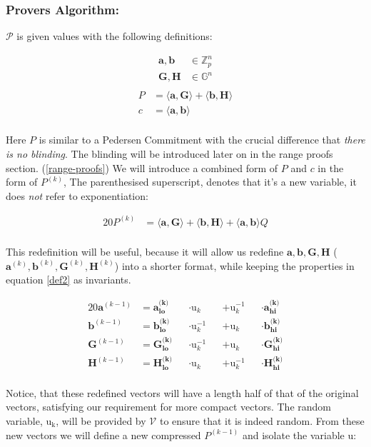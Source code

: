 \documentclass{article}
\newcommand{\eq}[1]{\begin{alignat*}{20}#1\end{alignat*}}
\newcommand{\eqn}[2]{\begin{equation}\label{#1}\begin{split}#2\end{split}\end{equation}}
\renewcommand{\vec}[1]{\boldsymbol{#1}}
\newcommand{\ran}[1]{\mathrm{#1}}
\newcommand{\V}{\mathcal{V}}
\renewcommand{\P}{\mathcal{P}}
\newcommand{\G}{\mathbb{G}}
\newcommand{\Z}{\mathbb{Z}}
\newcommand{\dotp}[2]{\langle #1, #2 \rangle}
\newcommand{\opn}[1]{\operatorname{#1}}
\newcommand{\veclo}[1]{\vec{#1_{\opn{lo}}}}
\newcommand{\vechi}[1]{\vec{#1_{\opn{hi}}}}
\begin{document}
\subsubsection{Provers Algorithm:}
$\P$ is given values with the following definitions:

\eqn{def1}{
	\vec{a}, \vec{b} &\in \Z^n_p \\
	\vec{G}, \vec{H} &\in \G^n \\
}
\eqn{def2}{
	P &= \dotp{\vec{a}}{\vec{G}} + \dotp{\vec{b}}{\vec{H}} \\
	c &= \dotp{\vec{a}}{\vec{b}} \\
}

Here $P$ is similar to a Pedersen Commitment with the crucial difference
that \textit{there is no blinding}. The blinding will be introduced
later on in the range proofs section. (\ref{range-proofs}) We will
introduce a combined form of $P$ and $c$ in the form of $P^{(k)}$,
The parenthesised superscript, denotes that it's a new variable,
it does \textit{not} refer to exponentiation:

\eq{
	P^{(k)} &= \dotp{\vec{a}}{\vec{G}} +
	           \dotp{\vec{b}}{\vec{H}} +
	           \dotp{\vec{a}}{\vec{b}}Q \\
} 

This redefinition will be useful, because it will allow us redefine
$\vec{a}, \vec{b}, \vec{G}, \vec{H}$ ($\vec{a}^{(k)}, \vec{b}^{(k)},
\vec{G}^{(k)}, \vec{H}^{(k)}$) into a shorter format, while keeping the
properties in equation \ref{def2} as invariants.

\eq{
	\vec{a}^{(k-1)} &= \veclo{a^{\text{(k)}}} &&\cdot \ran{u}_k      &&+ \ran{u}^{-1}_k &&\cdot \vechi{a^{\text{(k)}}} \\
	\vec{b}^{(k-1)} &= \veclo{b^{\text{(k)}}} &&\cdot \ran{u}^{-1}_k &&+ \ran{u}_k      &&\cdot \vechi{b^{\text{(k)}}} \\
	\vec{G}^{(k-1)} &= \veclo{G^{\text{(k)}}} &&\cdot \ran{u}^{-1}_k &&+ \ran{u}_k      &&\cdot \vechi{G^{\text{(k)}}} \\
	\vec{H}^{(k-1)} &= \veclo{H^{\text{(k)}}} &&\cdot \ran{u}_k      &&+ \ran{u}^{-1}_k &&\cdot \vechi{H^{\text{(k)}}} \\
}

Notice, that these redefined vectors will have a length half of that
of the original vectors, satisfying our requirement for more compact
vectors. The random variable, $\ran{u_k}$, will be provided by $\V$
to ensure that it is indeed random. From these new vectors we will
define a new compressed $P^{(k-1)}$ and isolate the variable $\ran{u}$:
\end{document}
